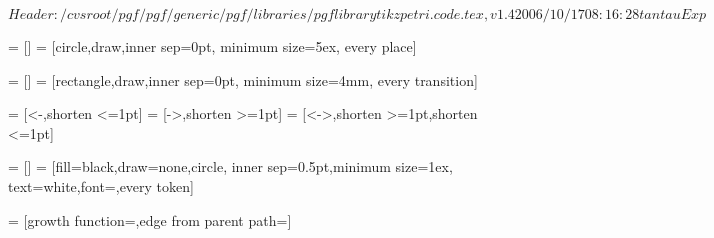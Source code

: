 %
%
%

\ProvidesFileRCS[v\pgfversion] $Header: /cvsroot/pgf/pgf/generic/pgf/libraries/pgflibrarytikzpetri.code.tex,v 1.4 2006/10/17 08:16:28 tantau Exp $



=           []
=                 [circle,draw,inner sep=0pt,
                                    minimum size=5ex,
                                    every place]



=      []
=            [rectangle,draw,inner sep=0pt,
                                    minimum size=4mm,
                                    every transition]



=                   [<-,shorten <=1pt]
=                  [->,shorten >=1pt]
=          [<->,shorten >=1pt,shorten <=1pt]




=           []
=                 [fill=black,draw=none,circle,
                                    inner sep=0.5pt,minimum size=1ex,
                                    text=white,font=\pgfutil@font@tiny,every token]

\def\tikz@token@distance{1.5ex}

=   [growth function=\tikz@grow@tokens,edge from parent path=]





